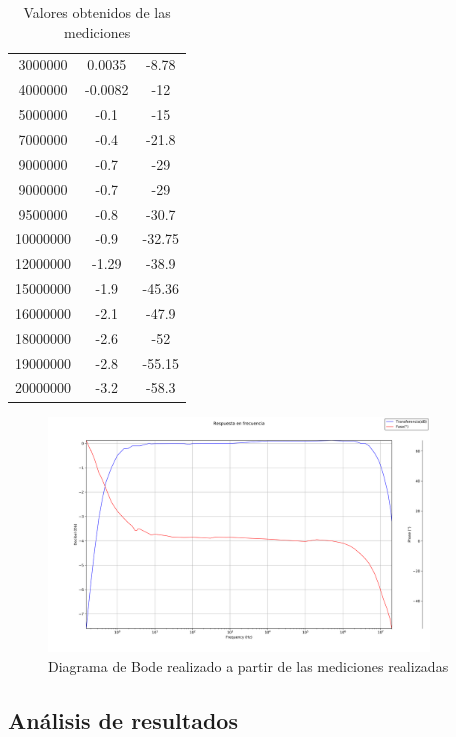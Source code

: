 \begin{table}[H]
{\begin{tabular}{|c c c|}
		3000000 & 0.0035 & -8.78 \\
		4000000 & -0.0082 & -12 \\ 
		5000000 & -0.1 & -15 \\ 
		7000000 & -0.4 & -21.8 \\
		9000000 & -0.7 & -29 \\ 
		9000000 & -0.7 & -29 \\ 
		9500000 & -0.8 & -30.7 \\
		10000000 & -0.9 & -32.75 \\
		12000000 & -1.29 & -38.9 \\ 
		15000000 & -1.9 & -45.36 \\ 
		16000000 & -2.1 & -47.9 \\ 
		18000000 & -2.6 & -52 \\ 
		19000000 & -2.8 & -55.15 \\
		20000000 & -3.2 & -58.3 \\ 
		\end{tabular}%
	}
	\caption{Valores obtenidos de las mediciones}

	\label{tab:Tabla}

	\end{table}
	\begin{figure}[H]
		\begin{center}
			\includegraphics[width=0.9\textwidth]{../Desarrollo/Bode_ej4.png}
		\end{center}
		\caption{Diagrama de Bode realizado a partir de las mediciones realizadas}
		\label{fig:Bode}
	\end{figure}

\subsection{An\'alisis de resultados}

